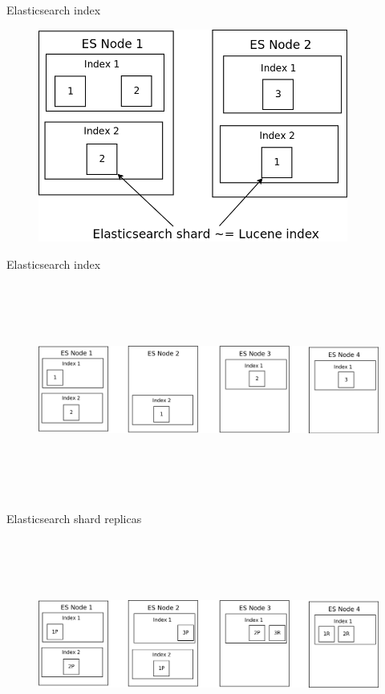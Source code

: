 \documentclass{beamer}
\begin{document}
\begin{frame}{Elasticsearch index}
	\begin{figure}
		\includegraphics[width=\textwidth,height=7cm,keepaspectratio=true]{elasticsearch-index}
	\end{figure}
\end{frame}
\begin{frame}{Elasticsearch index}
	\begin{figure}
		\includegraphics[width=\textwidth,height=7cm,keepaspectratio=true]{elasticsearch-more-nodes}
	\end{figure}
\end{frame}
\begin{frame}{Elasticsearch shard replicas}
	\begin{figure}
		\includegraphics[width=\textwidth,height=7cm,keepaspectratio=true]{elasticsearch-shard-replicas}
	\end{figure}
\end{frame}
\end{document}
